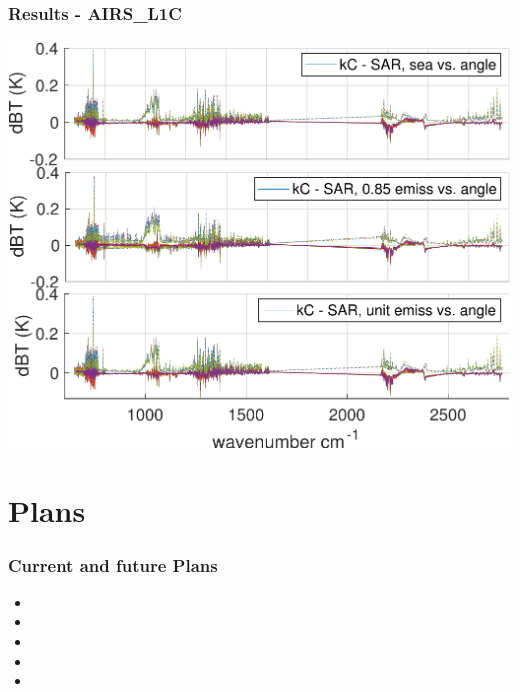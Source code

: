 \documentclass[10pt,t]{beamer}
\begin{document}
\begin{frame}
  \frametitle{Results - AIRS\_L1C}

  \begin{center}
    \includegraphics[width=0.9\linewidth]{./Figs/Pdf/kc_sar_airs_l1c_mean_stdv_sfc_emiss_vs_angle.pdf}
  \end{center}
  
  \end{frame}

\section{Plans}
\begin{frame}
  \frametitle{Current and future Plans}
  \begin{itemize}
  \item 
  \item 
  \item 
  \item 
  \item 
    
  \end{itemize}
\end{frame}

\end{document}
